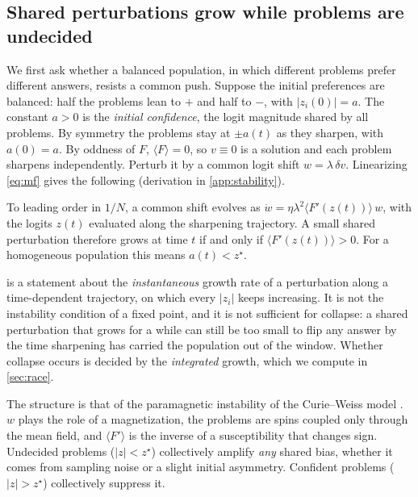 \subsection{Shared perturbations grow while problems are undecided}
We first ask whether a balanced population, in which different problems prefer different answers, resists a common push.
Suppose the initial preferences are balanced: half the problems lean to $+$ and half to $-$, with $|z_i(0)|=a$.
The constant $a>0$ is the \emph{initial confidence}, the logit magnitude shared by all problems. By symmetry the problems stay at $\pm a(t)$ as they sharpen, with $a(0)=a$.
By oddness of $F$, $\langle F\rangle=0$, so $v\equiv0$ is a solution and each problem sharpens independently.
Perturb it by a common logit shift $w=\lambda\,\delta v$. Linearizing \cref{eq:mf} gives the following (derivation in \cref{app:stability}).

\begin{proposition}
\label{prop:instab}
To leading order in $1/N$, a common shift evolves as $\dot w=\eta\lambda^2\langle F'(z(t))\rangle\,w$, with the logits $z(t)$ evaluated along the sharpening trajectory.
A small shared perturbation therefore grows at time $t$ if and only if $\langle F'(z(t))\rangle>0$. For a homogeneous population this means $a(t)<z^\star$.
\end{proposition}

 is a statement about the \emph{instantaneous} growth rate of a perturbation along a time-dependent trajectory, on which every $|z_i|$ keeps increasing. It is not the instability condition of a fixed point, and it is not sufficient for collapse: a shared perturbation that grows for a while can still be too small to flip any answer by the time sharpening has carried the population out of the window. Whether collapse occurs is decided by the \emph{integrated} growth, which we compute in \cref{sec:race}.

The structure is that of the paramagnetic instability of the Curie--Weiss model \citep{nishimori2001}.
$w$ plays the role of a magnetization, the problems are spins coupled only through the mean field, and $\langle F'\rangle$ is the inverse of a susceptibility that changes sign.
Undecided problems ($|z|<z^\star$) collectively amplify \emph{any} shared bias, whether it comes from sampling noise or a slight initial asymmetry.
Confident problems ($|z|>z^\star$) collectively suppress it.

